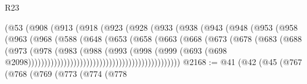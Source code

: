 \begin{lexlean}{R23}
\begin{coremodule}
                                (@53
                                  (@908
                                    (@913
                                      (@918
                                        (@923
                                          (@928
                                            (@933
                                              (@938
                                                (@943
                                                  (@948
                                                    (@953
                                                      (@958
                                                        (@963
                                                          (@968
                                                            (@588
                                                              (@648
                                                                (@653
                                                                  (@658
                                                                    (@663
                                                                      (@668
                                                                        (@673
                                                                          (@678
                                                                            (@683
                                                                              (@688
                                                                                (@973
                                                                                  (@978
                                                                                    (@983
                                                                                      (@988
                                                                                        (@993
                                                                                          (@998
                                                                                            (@999
                                                                                              (@693
                                                                                                (@698
                                                                                                  @2098)))))))))))))))))))))))))))))))))))))))))))))))
@2168 := @41
    (@42
      (@45
        (@767
          (@768
            (@769
              (@773
                (@774
                  (@778

\end{coremodule}
\end{lexlean}
